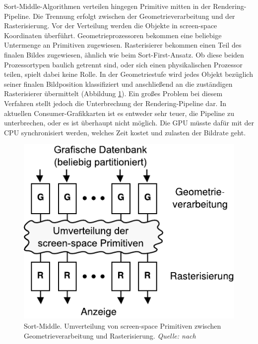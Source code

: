 Sort-Middle-Algorithmen verteilen hingegen Primitive mitten in der Rendering-Pipeline. Die Trennung erfolgt zwischen der Geometrieverarbeitung und der Rasterisierung. Vor der Verteilung werden die Objekte in screen-space Koordinaten überführt. Geometrieprozessoren bekommen eine beliebige Untermenge an Primitiven zugewiesen. Rasterisierer bekommen einen Teil des finalen Bildes zugewiesen, ähnlich wie beim Sort-First-Ansatz. Ob diese beiden Prozessortypen baulich getrennt sind, oder sich einen physikalischen Prozessor teilen, spielt dabei keine Rolle. In der Geometriestufe wird jedes Objekt bezüglich seiner finalen Bildposition klassifiziert und anschließend an die zuständigen Rasterisierer übermittelt (Abbildung \ref{fig:relwork:sortmiddle}). Ein großes Problem bei diesem Verfahren stellt jedoch die Unterbrechung der Rendering-Pipeline dar. In aktuellen Consumer-Grafikkarten ist es entweder sehr teuer, die Pipeline zu unterbrechen, oder es ist überhaupt nicht möglich. Die GPU müsste dafür mit der CPU synchronisiert werden, welches Zeit kostet und zulasten der Bildrate geht.
\begin{figure}
 \centering
  \includegraphics[scale=0.8]{images/sort-middle.pdf}
  \caption{Sort-Middle. Umverteilung von screen-space Primitiven zwischen Geometrieverarbeitung und Rasterisierung. \textit{Quelle: nach \cite{molnar}}}
 \label{fig:relwork:sortmiddle}
\end{figure}

